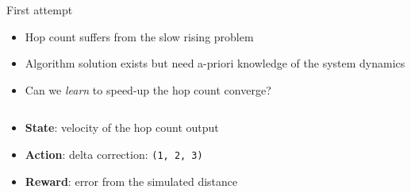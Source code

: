 \begin{frame}{\playfairblack First attempt}
  \begin{card}
    \begin{itemize}
      \item[\failure{\faThumbsDown}] Hop count suffers from the slow rising problem
      \item[\success{\faThumbsUp}] Algorithm solution exists but need a-priori knowledge of the system dynamics
      \item[\highlightAlt{\faLightbulb}] Can we \emph{learn} to speed-up the hop count converge?
    \end{itemize}
  \end{card}
  \begin{columns}[onlytextwidth, t]
    \begin{column}{0.5\textwidth}
      \begin{card}
        \begin{itemize}
          \item \textbf{State}: velocity of the hop count output
          \item \textbf{Action}: delta correction: \texttt{(1, 2, 3)}
          \item \textbf{Reward}: error from the simulated distance
        \end{itemize}
      \end{card}
    \end{column}
    \begin{column}{0.29\textwidth}
    \end{column}
  \end{columns}
\end{frame}